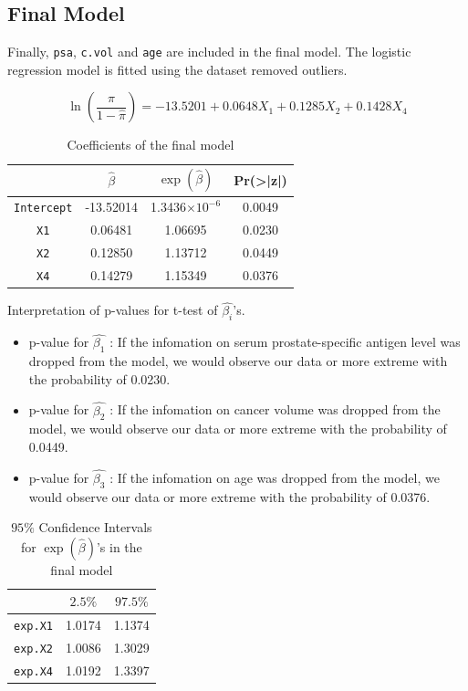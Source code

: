 \documentclass[a4paper,11pt,onecolumn,twoside]{article}
\begin{document}
\subsection{Final Model}
Finally, \texttt{psa}, \texttt{c.vol} and \texttt{age} are included in the final model. The logistic regression model is fitted using the dataset removed outliers.\par
\begin{equation}
\ln\left(\frac{\hat{\pi}}{1-\hat{\pi}}\right)= -13.5201+0.0648X_{1}+0.1285X_{2}+0.1428X_{4}  
\end{equation}
\begin{table}[H]
	\centering
	\begin{tabular}{cccc}
		\midrule[1.5pt]
		&$\hat{\beta}$&$\exp(\hat{\beta})$&Pr(>|z|)\\
		\hline 
		\texttt{Intercept} &-13.52014&1.3436$\times 10^{-6}$&0.0049\\ 
		\texttt{X1} &0.06481 &1.06695&0.0230\\ 
		\texttt{X2} &0.12850 &1.13712&0.0449\\
		\texttt{X4} &0.14279&1.15349&0.0376\\ 
		\midrule[1.5pt]
	\end{tabular}
	\caption{Coefficients of the final model}
\end{table}  
Interpretation of p-values for t-test of $\hat{\beta_{i}}$'s.\par
\begin{itemize}
	\item p-value for $\hat{\beta_{1}}$ : If the infomation on serum prostate-specific antigen level was dropped from the model, we would observe our data or more extreme with the probability of 0.0230.
	\item p-value for $\hat{\beta_{2}}$ : If the infomation on cancer volume was dropped from the model, we would observe our data or more extreme with the probability of 0.0449.
	\item p-value for $\hat{\beta_{3}}$ : If the infomation on age was dropped from the model, we would observe our data or more extreme with the probability of 0.0376.
\end{itemize}
\begin{table}[H]
	\centering
	\begin{tabular}{ccc}
		\midrule[1.5pt]
		&$2.5\%$&$97.5\%$\\
		\hline 
		\texttt{exp.X1}&1.0174 &1.1374\\
		\texttt{exp.X2}&1.0086 &1.3029\\
		\texttt{exp.X4}&1.0192 &1.3397\\
		\midrule[1.5pt]
	\end{tabular}
	\caption{$95\%$ Confidence Intervals for $\exp(\hat{\beta})$'s in the final model}
\end{table}
\end{document}
